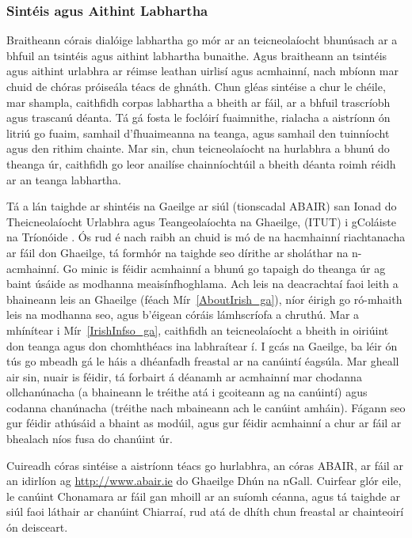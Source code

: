 \begin{multicols}{2}
\subsubsection*{Sintéis agus Aithint Labhartha}

Braitheann córais dialóige labhartha go mór ar an teicneolaíocht bhunúsach ar a bhfuil an tsintéis agus aithint labhartha bunaithe. Agus braitheann an tsintéis agus aithint urlabhra ar réimse leathan uirlisí agus acmhainní, nach mbíonn mar chuid de chóras próiseála téacs de ghnáth. Chun gléas sintéise a chur le chéile, mar shampla, caithfidh corpas labhartha a bheith ar fáil, ar a bhfuil trascríobh agus trascanú déanta. Tá gá fosta le foclóirí fuaimnithe, rialacha a aistríonn ón litriú go fuaim, samhail d’fhuaimeanna na teanga, agus samhail den tuinníocht agus den rithim chainte. Mar sin, chun teicneolaíocht na hurlabhra a bhunú do theanga úr, caithfidh go leor anailíse chainníochtúil a bheith déanta roimh réidh ar an teanga labhartha.

Tá a lán taighde ar shintéis na Gaeilge ar siúl (tionscadal ABAIR) san Ionad do Theicneolaíocht Urlabhra agus Teangeolaíochta na Ghaeilge, (ITUT) i gColáiste na Tríonóide \cite{pittsburgh}. Ós rud é nach raibh an chuid is mó de na hacmhainní riachtanacha ar fáil don Ghaeilge, tá formhór na taighde seo dírithe ar sholáthar na n-acmhainní. Go minic is féidir acmhainní a bhunú go tapaigh do theanga úr ag baint úsáide as modhanna meaisínfhoghlama. Ach leis na deacrachtaí faoi leith a bhaineann leis an Ghaeilge (féach Mír~\ref{AboutIrish_ga}), níor éirigh go ró-mhaith leis na modhanna seo, agus b’éigean córáis lámhscríofa a chruthú. Mar a mhínítear i Mír~\ref{IrishInfso_ga}, caithfidh an teicneolaíocht a bheith in oiriúint don teanga agus don chomhthéacs ina labhraítear í. I gcás na Gaeilge, ba léir ón tús go mbeadh gá le háis a dhéanfadh freastal ar na canúintí éagsúla. Mar gheall air sin, nuair is féidir, tá forbairt á déanamh ar acmhainní mar chodanna ollchanúnacha (a bhaineann le tréithe atá i gcoiteann ag na canúintí) agus codanna chanúnacha (tréithe nach mbaineann ach le canúint amháin). Fágann seo gur féidir athúsáid a bhaint as modúil, agus gur féidir acmhainní a chur ar fáil ar bhealach níos fusa do chanúint úr.

Cuireadh córas sintéise a aistríonn téacs go hurlabhra, an córas ABAIR, ar fáil ar an idirlíon ag \url{http://www.abair.ie} do Ghaeilge Dhún na nGall. Cuirfear glór eile, le canúint Chonamara ar fáil gan mhoill ar an suíomh céanna, agus tá taighde ar siúl faoi láthair ar chanúint Chiarraí, rud atá de dhíth chun freastal ar chainteoirí ón deisceart.


\end{multicols}
